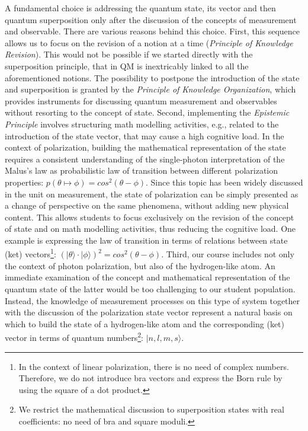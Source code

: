 \documentclass[twocolumn,secnumarabic,amssymb, nobibnotes, aps, prd, nofootinbib]{revtex4-2}
\begin{document}
A fundamental choice is addressing the quantum state, its vector and then quantum superposition only after the discussion of the concepts of measurement and observable. There are various reasons behind this choice. First, this sequence allows us to focus on the revision of a notion at a time (\textit{Principle of Knowledge Revision}). This would not be possible if we started directly with the superposition principle, that in QM is inextricably linked to all the aforementioned notions. The possibility to postpone the introduction of the state and superposition is granted by the \textit{Principle of Knowledge Organization}, which provides instruments for discussing quantum measurement and observables without resorting to the concept of state. Second, implementing the \textit{Epistemic Principle} involves structuring math modelling activities, e.g., related to the introduction of the state vector, that may cause a high cognitive load. In the context of polarization, building the mathematical representation of the state requires a consistent understanding of the single-photon interpretation of the Malus's law as probabilistic law of transition between different polarization properties: $p(\theta\mapsto\phi)=cos^2{(\theta-\phi)}$. Since this topic has been widely discussed in the unit on measurement, the state of polarization can be simply presented as a change of perspective on the same phenomena, without adding new physical content. This allows students to focus exclusively on the revision of the concept of state and on math modelling activities, thus reducing the cognitive load. One example is expressing the law of transition in terms of relations between state (ket) vectors\footnote{In the context of linear polarization, there is no need of complex numbers. Therefore, we do not introduce bra vectors and express the Born rule by using the square of a dot product.}: $(|\theta\rangle\cdot|\phi\rangle)^2=cos^2{(\theta-\phi)}$. Third, our course includes not only the context of photon polarization, but also of the hydrogen-like atom. An immediate examination of the concept and mathematical representation of the quantum state of the latter would be too challenging to our student population. Instead, the knowledge of measurement processes on this type of system together with the discussion of the polarization state vector represent a natural basis on which to build the state of a hydrogen-like atom and the corresponding (ket) vector in terms of quantum numbers\footnote{We restrict the mathematical discussion to superposition states with real coefficients: no need of bra and square moduli.}: $|n, l, m, s \rangle$.
\end{document}
